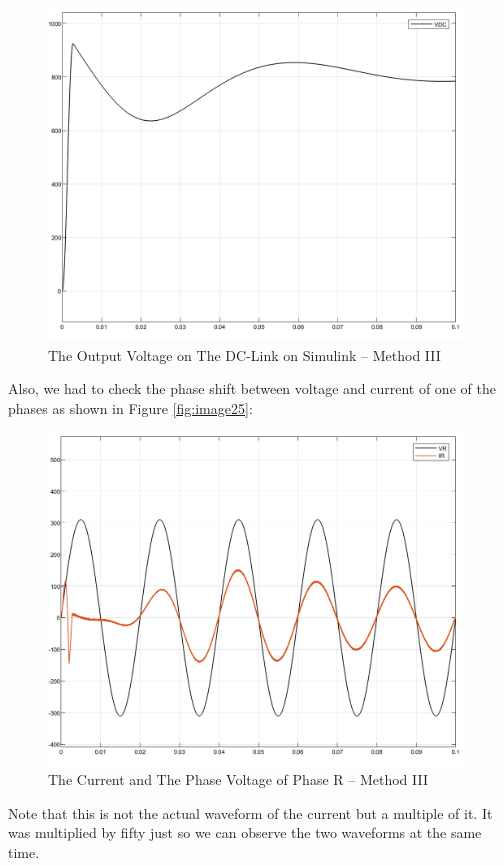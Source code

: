 \documentclass[12pt,a4paper]{book}
\begin{document}
\begin{figure}[h!]
  \centering
  \includegraphics[width=11cm]{image26.png}
  \caption{The Output Voltage on The DC-Link on Simulink -- Method III}
  \label{fig:image26}
\end{figure}
Also, we had to check the phase shift between voltage and current of one of the phases as shown in Figure \ref{fig:image25}:

\begin{figure}[h!]
  \centering
  \includegraphics[width=11cm]{image27.png}
  \caption{The Current and The Phase Voltage of Phase R -- Method III}
  \label{fig:image27}
\end{figure}
Note that this is not the actual waveform of the current but a multiple of it. It was multiplied by fifty just so we can observe the two waveforms at the same time.
\end{document}
